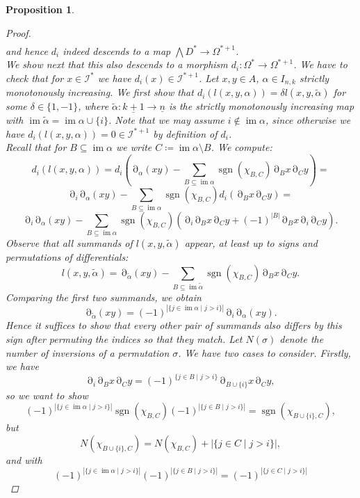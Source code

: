 \documentclass[10pt, a4paper, UKenglish]{article}
\numberwithin{equation}{section}
\newcommand{\cI}{\mathcal{I}}
\newcommand{\defas}{\coloneqq}  %
\newcommand{\abs}[1]{\left\vert#1\right\vert}	%
\newcommand{\with}{\mid}  %
\newcommand{\ind}[1]{\underline{#1}}
\newcommand{\n}{\ind{n}}
\renewcommand{\subset}{\subseteq}
\newcommand{\sgn}{\operatorname{sgn}}
\newcommand{\im}{\operatorname{im}}
\theoremstyle{plain}
\newtheorem{prop}[equation]{Proposition}
\theoremstyle{definition}
\renewcommand{\to}{\longrightarrow}
\newcommand{\del}{\operatorname{\partial}}
\begin{document}
\begin{prop}
\begin{proof}
\begin{gather*}
\end{gather*}
and hence $d_i$ indeed descends to a map $\bigwedge D ^* \to \Omega ^ {*+1}$.
\\
We show next that this also descends to a morphism $d_i: \Omega^* \to \Omega^{*+1}$. We have to check that for $x \in \mathcal{I}^*$ we have $d_i(x) \in \mathcal{I}^{*+1}$. Let $x,y \in A$, $\alpha \in I_{n,k}$ strictly monotonously increasing. We first show that $d_i ( l(x,y,\alpha) ) = \delta l(x,y,\tilde \alpha)$ for some $\delta \in \{1,-1\}$, where $\tilde \alpha: \ind{k+1} \to \n$ is the strictly monotonously increasing map with $\im \tilde \alpha = \im \alpha \cup \{i\}$. Note that we may assume $i \notin \im \alpha$, since otherwise we have $d_i ( l(x,y,\alpha) ) = 0 \in \cI^{*+1}$ by definition of $d_i$.\\
Recall that for $B \subseteq \im \alpha$ we write $C \defas \im \alpha \setminus B$. We compute:
    \[ d_i ( l(x,y,\alpha) ) =  d_i \left( \del_\alpha (xy) - \sum\limits_{B \subset%
    \im \alpha} \sgn(\chi_{B,C}) \del_B x \del_C y \right) = \]%
    \[ \del_i \del_\alpha (xy) - \sum\limits_{B \subseteq \im \alpha} \sgn(\chi_{B,C})%
    d_i ( \del_B x \del_C y ) = \]%
    \[ \del_i \del_\alpha (xy) - \sum\limits_{B \subseteq \im \alpha} \sgn(\chi_{B,C})%
    ( \del_i \del_B x \del_C y + (-1)^{\abs{B}} \del_B x \del_i \del_C y ). \]
Observe that all summands of $l(x,y,\tilde \alpha)$ appear, at least up to signs and permutations of differentials:
    \[ l(x,y,\tilde \alpha) = \del_{\tilde \alpha} (xy) - \sum_{B \subseteq \im \tilde \alpha} \sgn (\chi_{B,C})%
    \del_B x \del_C y. \]
Comparing the first two summands, we obtain
    \[ \del_{\tilde \alpha} (xy) = %
    (-1)^{\abs{\{ j \in \im \alpha \with j > i \}} } \del_i\del_\alpha (xy). \]
Hence it suffices to show that every other pair of summands also differs by this sign after permuting the indices so that they match. Let $N(\sigma)$ denote the number of inversions of a permutation $\sigma$. We have two cases to consider. Firstly, we have
    \[ \del_i \del_B x \del_C y = %
    (-1)^{ \{j \in B \with j > i\} } \del_{ B \cup \{i\} } x \del_C y,\]
so we want to show%
    \[ (-1)^{\abs{\{ j \in \im \alpha \with j > i \}} } \sgn(\chi_{B,C}) %
    (-1)^{\abs{\{ j \in B \with j > i \}} } = \sgn(\chi_{B \cup \{i\},C}),\]%
but
    \[ N(\chi_{B \cup \{i\},C}) = N(\chi_{B,C}) + %
    \abs{ \{ j \in C \with j > i\} }, \]%
and with%
    \[(-1)^{\abs{\{ j \in \im \alpha \with j > i \}} }  (-1)^{ \abs{ %
    \{ j \in B \with j > i \} } } = (-1)^{ \abs{ \{j \in C \with j > i\} } }\]%

\end{proof}
\end{prop}
\end{document}
